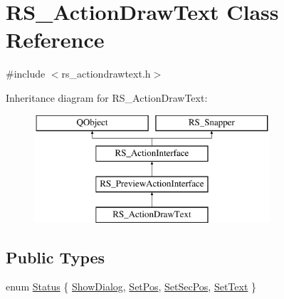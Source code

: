 \hypertarget{classRS__ActionDrawText}{\section{R\-S\-\_\-\-Action\-Draw\-Text Class Reference}
\label{classRS__ActionDrawText}
}


{\ttfamily \#include $<$rs\-\_\-actiondrawtext.\-h$>$}

Inheritance diagram for R\-S\-\_\-\-Action\-Draw\-Text\-:\begin{figure}[H]
\begin{center}
\leavevmode
\includegraphics[height=4.000000cm]{classRS__ActionDrawText}
\end{center}
\end{figure}
\subsection*{Public Types}
\begin{DoxyCompactItemize}
\item 
enum \hyperlink{classRS__ActionDrawText_a55d580fc72318ace8adf6bcdf5a4e090}{Status} \{ \hyperlink{classRS__ActionDrawText_a55d580fc72318ace8adf6bcdf5a4e090a404efac9d4217f7fa8fb973678dcaa75}{Show\-Dialog}, 
\hyperlink{classRS__ActionDrawText_a55d580fc72318ace8adf6bcdf5a4e090ab38cef29ebe48939625c019ba22f1df4}{Set\-Pos}, 
\hyperlink{classRS__ActionDrawText_a55d580fc72318ace8adf6bcdf5a4e090ad6b375a4094d323a20eb9b13b764c438}{Set\-Sec\-Pos}, 
\hyperlink{classRS__ActionDrawText_a55d580fc72318ace8adf6bcdf5a4e090a4a498c70407a82f484e1d21596c4e266}{Set\-Text}
 \}
\end{DoxyCompactItemize}
